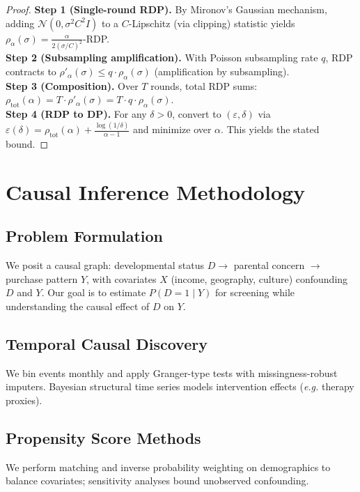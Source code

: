 \documentclass[conference]{IEEEtran}
\newcommand{\eg}{\emph{e.g.}\xspace}
\newcommand{\eps}{\varepsilon}
\theoremstyle{plain}
\theoremstyle{remark}
\begin{document}
\begin{proof}
\textbf{Step 1 (Single-round RDP).} By Mironov's Gaussian mechanism, adding $\mathcal{N}(0,\sigma^2 C^2 I)$ to a $C$-Lipschitz (via clipping) statistic yields $\rho_\alpha(\sigma)=\frac{\alpha}{2(\sigma/C)^2}$-RDP.\\
\textbf{Step 2 (Subsampling amplification).} With Poisson subsampling rate $q$, RDP contracts to $\rho'_\alpha(\sigma)\le q\cdot \rho_\alpha(\sigma)$ (amplification by subsampling).\\
\textbf{Step 3 (Composition).} Over $T$ rounds, total RDP sums: $\rho_{\mathrm{tot}}(\alpha)=T\cdot \rho'_\alpha(\sigma)=T\cdot q \cdot \rho_\alpha(\sigma)$.\\
\textbf{Step 4 (RDP to DP).} For any $\delta>0$, convert to $(\eps,\delta)$ via $\eps(\delta)=\rho_{\mathrm{tot}}(\alpha)+\frac{\log(1/\delta)}{\alpha-1}$ and minimize over $\alpha$. This yields the stated bound.
\end{proof}

\section{Causal Inference Methodology}\label{sec:causal}
\subsection{Problem Formulation}
We posit a causal graph: developmental status $D \rightarrow$ parental concern $\rightarrow$ purchase pattern $Y$, with covariates $X$ (income, geography, culture) confounding $D$ and $Y$. Our goal is to estimate $P(D{=}1\mid Y)$ for screening while understanding the causal effect of $D$ on $Y$.

\subsection{Temporal Causal Discovery}
We bin events monthly and apply Granger-type tests with missingness-robust imputers. Bayesian structural time series models intervention effects (\eg therapy proxies).

\subsection{Propensity Score Methods}
We perform matching and inverse probability weighting on demographics to balance covariates; sensitivity analyses bound unobserved confounding.
\end{document}
